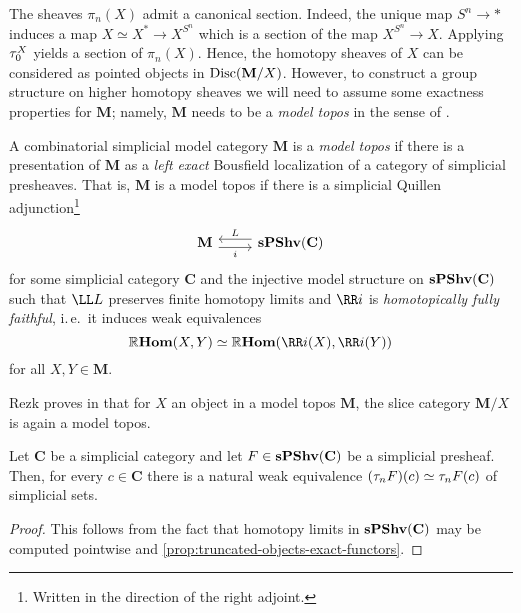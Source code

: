 The sheaves \(\pi_{n}(X)\) admit a canonical section. Indeed, the unique map \(S^{n}\to *\) induces a map \(X\simeq X^{*}\to X^{S^{n}}\) which is a section of the map \(X^{S^{n}}\to X\). Applying \(\tau_{0}^{X}\) yields a section of \(\pi_{n}(X)\). Hence, the homotopy sheaves of \(X\) can be considered as pointed objects in \(\operatorname{\textnormal{Disc}}(\mathbf M/X)\). However, to construct a group structure on higher homotopy sheaves we will need to assume some exactness properties for \(\mathbf M\); namely, \(\mathbf M\) needs to be a \emph{model topos} in the sense of \cite{rezkhomotopytoposes}.

\begin{definition}\label{defn:model-topos}
  A combinatorial simplicial model category \(\mathbf M\) is a \emph{model topos} if there is a presentation of \(\mathbf M\) as a \emph{left exact} Bousfield localization of a category of simplicial presheaves. That is, \(\mathbf M\) is a model topos if there is a simplicial Quillen adjunction\footnote{Written in the direction of the right adjoint.}
\[
\begin{tikzcd}
  \mathbf M \arrow[r, shift right=.7ex, "i"'] & \arrow[l, shift right=.7ex, "L"'] \spshv(\mathbf C)
\end{tikzcd}
\]
for some simplicial category \(\mathbf C\) and the injective model structure on \(\operatorname{\textnormal{\bfseries sPShv}}(\mathbf C)\) such that \(\LL L\) preserves finite homotopy limits and \(\RR i\) is \emph{homotopically fully faithful}, i.\,e.~it induces weak equivalences
\[\RHom(X, Y)\simeq\RHom(\RR i(X), \RR i(Y))\]
for all \(X,Y\in\mathbf M\).
\end{definition}

Rezk proves in \cite[Corollary~6.10]{rezkhomotopytoposes} that for \(X\) an object in a model topos \(\mathbf M\), the slice category \(\mathbf M/X\) is again a model topos.

\begin{lemma}\label{lem:trunc-presheaves}
  Let \(\mathbf C\) be a simplicial category and let \(F\in\operatorname{\textnormal{\bfseries sPShv}}(\mathbf C)\) be a simplicial presheaf. Then, for every \(c\in\mathbf C\) there is a natural weak equivalence \((\tau_{n}F)(c)\simeq \tau_{n}F(c)\) of simplicial sets.
\end{lemma}
\begin{proof}
  This follows from the fact that homotopy limits in \(\operatorname{\textnormal{\bfseries sPShv}}(\mathbf C)\) may be computed pointwise and \autoref{prop:truncated-objects-exact-functors}.
\end{proof}

